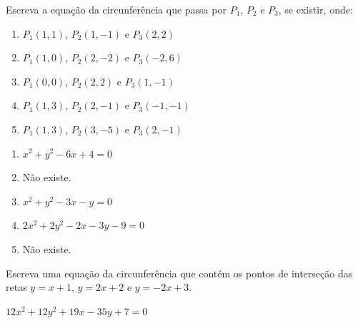 \documentclass[12pt]{exam}
\begin{document}
\begin{exercicio}
    Escreva a equação da circunferência que passa por $P_1$, $P_2$ e $P_3$, se existir, onde:
    \begin{enumerate}[label=({\alph*})]
        \item $P_1(1,1)$, $P_2(1,-1)$ e $P_3(2,2)$
        \item $P_1(1,0)$, $P_2(2,-2)$ e $P_3(-2,6)$
        \item $P_1(0,0)$, $P_2(2,2)$ e $P_3(1,-1)$
        \item $P_1(1,3)$, $P_2(2,-1)$ e $P_3(-1,-1)$
        \item $P_1(1,3)$, $P_2(3,-5)$ e $P_3(2,-1)$
    \end{enumerate}
    \begin{solucao}
        \begin{enumerate}[label=({\alph*})]
            \item $x^2 + y^2 -6x + 4 = 0$
            \item Não existe.
            \item $x^2 + y^2  - 3x - y = 0$
            \item $2x^2 + 2y^2 - 2x - 3y - 9 = 0$
            \item Não existe.
        \end{enumerate}
    \end{solucao}
\end{exercicio}
\begin{exercicio}
    Escreva uma equação da circunferência que contém os pontos de interseção das retas $y = x + 1$, $y = 2x + 2$ e $y = -2x + 3$.
    \begin{solucao}
        $12x^2 + 12y^2 + 19x - 35y + 7 = 0$
    \end{solucao}
\end{exercicio}
\end{document}
